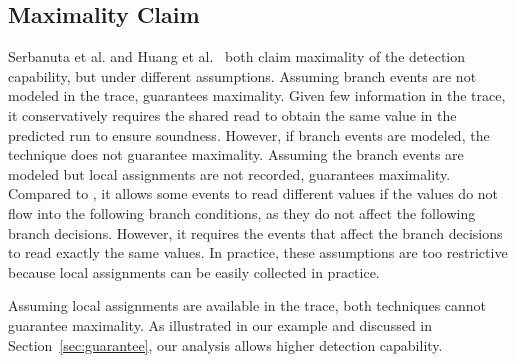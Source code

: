 \subsection{Maximality Claim}
Serbanuta et al. \cite{maximal} and Huang et al.~\cite{pldi14} both 
claim maximality of the detection capability, but under different assumptions. 
Assuming branch events are not modeled in the trace, \cite{maximal} guarantees maximality. Given few 
information in the trace, it conservatively requires the shared read to 
obtain the same value in the predicted run to ensure soundness. However, if 
branch events are modeled, the technique does not guarantee maximality.  
Assuming the branch events are modeled but local assignments are not recorded, 
\cite{pldi14} guarantees maximality. 
Compared to \cite{maximal}, it allows some events to read different 
values if the values do not flow into the following branch conditions, as they do not affect the following branch decisions. However, 
it requires the events that affect the branch decisions to read exactly 
the same values. In practice, these assumptions are too restrictive  
because local assignments can be easily collected in practice.

Assuming local assignments are available in the trace, both techniques 
cannot guarantee maximality. As illustrated in our example and discussed 
in Section~\ref{sec:guarantee}, our analysis allows higher detection capability.
 


